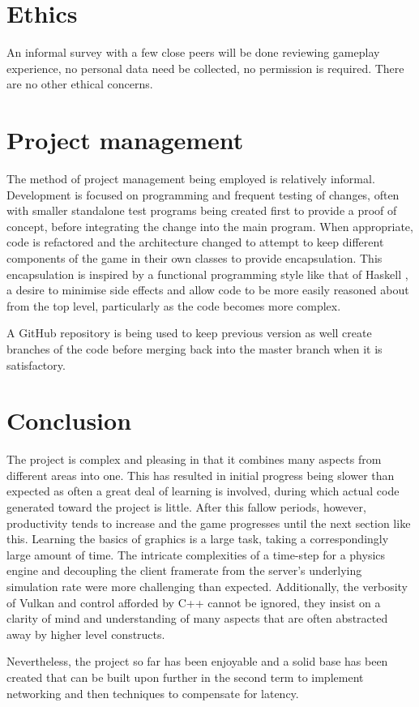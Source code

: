 \documentclass[titlepage]{article}
\begin{document}
\section{Ethics}

	An informal survey with a few close peers will be done reviewing gameplay experience, no personal data need be collected, no permission is required. There are no other ethical concerns.

\section{Project management}

	The method of project management being employed is relatively informal. Development is focused on programming and frequent testing of changes, often with smaller standalone test programs being created first to provide a proof of concept, before integrating the change into the main program. When appropriate, code is refactored and the architecture changed to attempt to keep different components of the game in their own classes to provide encapsulation. This encapsulation is inspired by a functional programming style like that of Haskell \cite{haskellWiki}, a desire to minimise side effects and allow code to be more easily reasoned about from the top level, particularly as the code becomes more complex.

	A GitHub repository is being used to keep previous version as well create branches of the code before merging back into the master branch when it is satisfactory.

\section{Conclusion}

	The project is complex and pleasing in that it combines many aspects from different areas into one. This has resulted in initial progress being slower than expected as often a great deal of learning is involved, during which actual code generated toward the project is little. After this fallow periods, however, productivity tends to increase and the game progresses until the next section like this. Learning the basics of graphics is a large task, taking a correspondingly large amount of time. The intricate complexities of a time-step for a physics engine and decoupling the client framerate from the server's underlying simulation rate were more challenging than expected. Additionally, the verbosity of Vulkan and control afforded by C++ cannot be ignored, they insist on a clarity of mind and understanding of many aspects that are often abstracted away by higher level constructs.

	Nevertheless, the project so far has been enjoyable and a solid base has been created that can be built upon further in the second term to implement networking and then techniques to compensate for latency.

\clearpage


\end{document}
